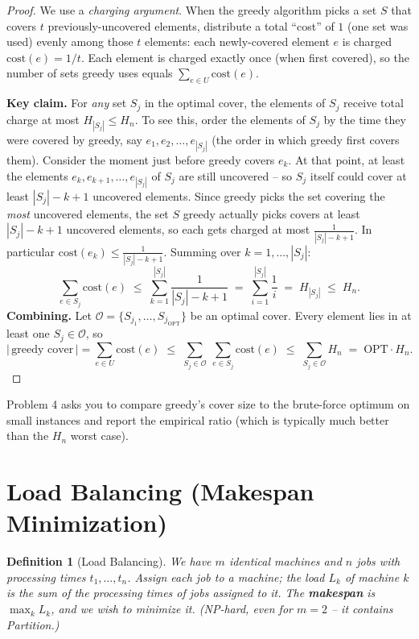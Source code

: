 \documentclass[11pt]{article}
\newtheorem{definition}[theorem]{Definition}
\begin{document}
\begin{proof}
We use a \emph{charging argument}. When the greedy algorithm picks a set $S$ that covers
$t$ previously-uncovered elements, distribute a total ``cost'' of $1$ (one set was used)
evenly among those $t$ elements: each newly-covered element $e$ is charged
$\mathrm{cost}(e) = 1/t$. Each element is charged exactly once (when first covered), so the
number of sets greedy uses equals $\sum_{e \in U} \mathrm{cost}(e)$.

\textbf{Key claim.} For \emph{any} set $S_j$ in the optimal cover, the elements of $S_j$
receive total charge at most $H_{|S_j|} \le H_n$. To see this, order the elements of
$S_j$ by the time they were covered by greedy, say $e_1, e_2, \ldots, e_{|S_j|}$ (the
order in which greedy first covers them). Consider the moment just before greedy covers
$e_k$. At that point, at least the elements $e_k, e_{k+1}, \ldots, e_{|S_j|}$ of $S_j$ are
still uncovered -- so $S_j$ itself could cover at least $|S_j| - k + 1$ uncovered
elements. Since greedy picks the set covering the \emph{most} uncovered elements, the set
$S$ greedy actually picks covers at least $|S_j| - k + 1$ uncovered elements, so each gets
charged at most $\frac{1}{|S_j| - k + 1}$. In particular $\mathrm{cost}(e_k) \le
\frac{1}{|S_j| - k + 1}$. Summing over $k = 1, \ldots, |S_j|$:
\[
    \sum_{e \in S_j} \mathrm{cost}(e) \;\le\; \sum_{k=1}^{|S_j|} \frac{1}{|S_j| - k + 1}
    \;=\; \sum_{i=1}^{|S_j|} \frac{1}{i} \;=\; H_{|S_j|} \;\le\; H_n .
\]
\textbf{Combining.} Let $\mathcal{O} = \{S_{j_1}, \ldots, S_{j_{\mathrm{OPT}}}\}$ be an
optimal cover. Every element lies in at least one $S_j \in \mathcal{O}$, so
\[
    |\,\text{greedy cover}\,| = \sum_{e \in U} \mathrm{cost}(e)
    \;\le\; \sum_{S_j \in \mathcal{O}} \ \sum_{e \in S_j} \mathrm{cost}(e)
    \;\le\; \sum_{S_j \in \mathcal{O}} H_n
    \;=\; \mathrm{OPT}\cdot H_n .
\]
\end{proof}

Problem 4 asks you to compare greedy's cover size to the brute-force optimum on small
instances and report the empirical ratio (which is typically much better than the $H_n$
worst case).

\section{Load Balancing (Makespan Minimization)}

\begin{definition}[Load Balancing]
We have $m$ identical machines and $n$ jobs with processing times $t_1, \ldots, t_n$.
Assign each job to a machine; the \emph{load} $L_k$ of machine $k$ is the sum of the
processing times of jobs assigned to it. The \textbf{makespan} is $\max_k L_k$, and we
wish to minimize it. (NP-hard, even for $m = 2$ -- it contains Partition.)
\end{definition}
\end{document}
